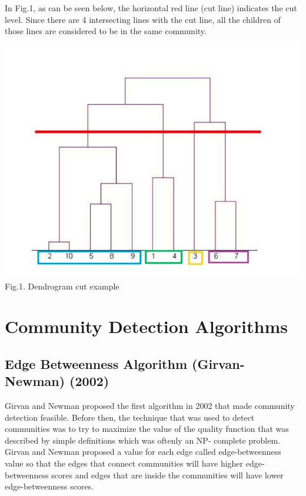 \documentclass[10pt]{article}
\begin{document}
In Fig.1, as can be seen below, the horizontal red line (cut line) indicates the cut level. Since there are 4 intersecting lines with the cut line, all the children of those lines are considered to be in the same community. \\

\begin{center}
    \includegraphics[scale=0.2]{dendrogram.png} \\
    Fig.1. Dendrogram cut example
\end{center}

\section{Community Detection Algorithms}

\subsection{Edge Betweenness Algorithm (Girvan-Newman) (2002)}

Girvan and Newman proposed the first algorithm in 2002 that made community detection feasible. Before then, the technique that was used to detect communities was to try to maximize the value of the quality function that was described by simple definitions which was oftenly an NP- complete problem. \\

Girvan and Newman proposed a value for each edge called edge-betweenness value so that the edges that connect communities will have higher edge-betweenness scores and edges that are inside the communities will have lower edge-betweenness scores\cite{raghavan}. \\
\end{document}

